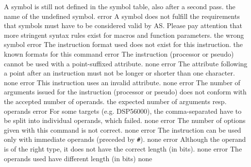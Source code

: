\documentclass[12pt,twoside]{report}
\newcommand{\tty}[1]{{\tt #1}}
\begin{document}
\begin{description}
               {A symbol is still not defined in the symbol table, also
                after a second pass.}
               {the name of the undefined symbol.}
               {error}
               {A symbol does not fulfill the requirements that symbols
                must have to be considered valid by AS. Please pay
                attention that more stringent syntax rules exist for
                macros and function parameters.}
               {the wrong symbol}
               {error}
               {The instruction format used does not exist for this
                instruction.}
               {the known formats for this command}
               {error}
               {The instruction (processor or pseudo) cannot be used with a
                point-suffixed attribute.}
               {none}
               {error}
               {The attribute following a point after an instruction must
                not be longer or shorter than one character.}
               {none}
               {error}
               {This instruction uses an invalid attribute.}
               {none}
               {error}
               {The number of arguments issued for the instruction (processor or
                pseudo) does not conform with the accepted number of
                operands.}
               {the expected number of arguments resp. operands}
               {error}
               {For some targets (e.g. DSP56000), the
                comma-separated have to be split into individual
                operands, which failed.}
               {none}
               {error}
               {The number of options given with this command is not
                correct.}
               {none}
               {error}
               {The instruction can be used only with immediate operands
                (preceded by \tty{\#}).}
               {none}
               {error}
               {Although the operand is of the right type, it does not have
                the correct length (in bits).}
               {none}
               {error}
               {The operands used have different length (in bits)}
               {none}

\end{description}
\end{document}
